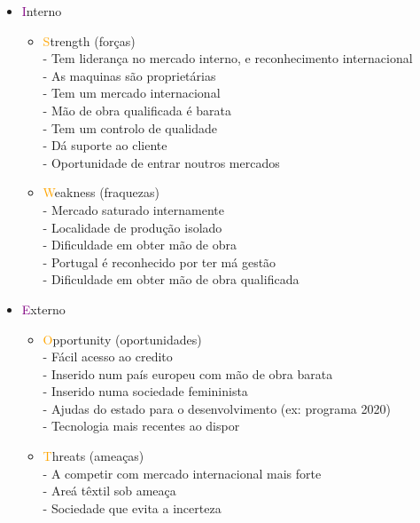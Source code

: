 \begin{itemize}
\setlength\itemsep{-0.5em}
\item \textcolor{purple}{I}nterno
\begin{itemize}
\setlength\itemsep{-0.3em}
\item \textcolor{orange}{S}trength (forças)\\
- Tem liderança no mercado interno, e reconhecimento internacional\\
- As maquinas são proprietárias\\
- Tem um mercado internacional\\
- Mão de obra qualificada é barata\\
- Tem um controlo de qualidade\\
- Dá suporte ao cliente\\
- Oportunidade de entrar noutros mercados
\item \textcolor{orange}{W}eakness (fraquezas)\\
- Mercado saturado internamente\\
- Localidade de produção isolado\\
- Dificuldade em obter mão de obra\\
- Portugal é reconhecido por ter má gestão\\
- Dificuldade em obter mão de obra qualificada\\
\end{itemize}
\item \textcolor{purple}{E}xterno
\begin{itemize}
\setlength\itemsep{-0.3em}
\item \textcolor{orange}{O}pportunity (oportunidades)\\
- Fácil acesso ao credito\\
- Inserido num país europeu com mão de obra barata\\
- Inserido numa sociedade femininista\\
- Ajudas do estado para o desenvolvimento (ex: programa 2020)\\
- Tecnologia mais recentes ao dispor\\
\item \textcolor{orange}{T}hreats (ameaças)\\
- A competir com mercado internacional mais forte\\
- Areá têxtil sob ameaça\\
- Sociedade que evita a incerteza
\end{itemize}
\end{itemize}
\newpage
